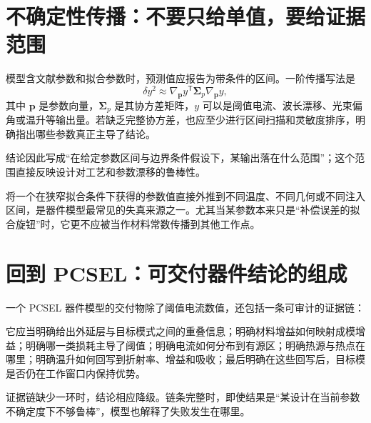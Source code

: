 \section{不确定性传播：不要只给单值，要给证据范围}
模型含文献参数和拟合参数时，预测值应报告为带条件的区间。一阶传播写法是
\begin{equation}
\delta y^2
\approx
\nabla_{\bm p} y^{\mathsf T}
\mathbf{\Sigma}_p
\nabla_{\bm p} y,
\label{eq:uncertainty_appendix}
\end{equation}
其中 $\bm p$ 是参数向量，$\mathbf{\Sigma}_p$ 是其协方差矩阵，$y$ 可以是阈值电流、波长漂移、光束偏角或温升等输出量。若缺乏完整协方差，也应至少进行区间扫描和灵敏度排序，明确指出哪些参数真正主导了结论。

结论因此写成“在给定参数区间与边界条件假设下，某输出落在什么范围”；这个范围直接反映设计对工艺和参数漂移的鲁棒性。

\begin{PitfallBox}
将一个在狭窄拟合条件下获得的参数值直接外推到不同温度、不同几何或不同注入区间，是器件模型最常见的失真来源之一。尤其当某参数本来只是“补偿误差的拟合旋钮”时，它更不应被当作材料常数传播到其他工作点。
\end{PitfallBox}

\section{回到 PCSEL：可交付器件结论的组成}
一个 PCSEL 器件模型的交付物除了阈值电流数值，还包括一条可审计的证据链：

它应当明确给出外延层与目标模式之间的重叠信息；明确材料增益如何映射成模增益；明确哪一类损耗主导了阈值；明确电流如何分布到有源区；明确热源与热点在哪里；明确温升如何回写到折射率、增益和吸收；最后明确在这些回写后，目标模是否仍在工作窗口内保持优势。

证据链缺少一环时，结论相应降级。链条完整时，即使结果是“某设计在当前参数不确定度下不够鲁棒”，模型也解释了失败发生在哪里。

